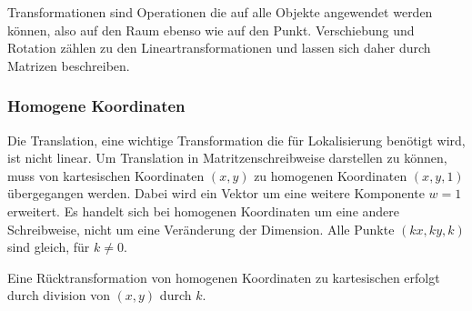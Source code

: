 Transformationen sind Operationen die auf alle Objekte angewendet werden können, also auf den Raum ebenso wie auf den Punkt. Verschiebung und Rotation zählen zu den Lineartransformationen und lassen sich daher durch Matrizen beschreiben.

\subsubsection{Homogene Koordinaten}
Die Translation, eine wichtige Transformation die für Lokalisierung benötigt wird, ist nicht linear. Um Translation in Matritzenschreibweise darstellen zu können, muss von kartesischen Koordinaten $(x ,y)$ zu homogenen Koordinaten $(x, y, 1)$ übergegangen werden. Dabei wird ein Vektor um eine weitere Komponente $w = 1$ erweitert. Es handelt sich bei homogenen Koordinaten um eine andere Schreibweise, nicht um eine Veränderung der Dimension. Alle Punkte $(kx, ky, k)$ sind gleich, für $k \neq 0$. 

Eine Rücktransformation von homogenen Koordinaten zu kartesischen erfolgt durch division von $(x,y)$ durch $k$. 

